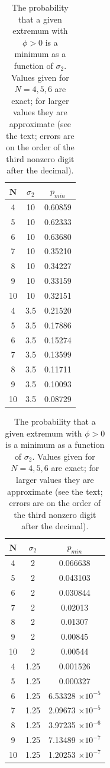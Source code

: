 \documentclass[12pt]{article}
\begin{document}
\begin{table}[h!] \label{Data}
  \begin{center}
    \caption{The probability that a given extremum with $\phi > 0$ is a minimum as a function of $\sigma_2$. Values given for $N=4,5,6$ are exact; for larger values they are approximate (see the text; errors are on the order of the third nonzero digit after the decimal).}
    \label{tab:table1}
    \begin{tabular}{c|c|c} %
      $\textbf{N}$ & $\sigma_2$ & $p_{min}$\\
      \hline
      4 & 10 & 0.60859\\
      5 & 10 & 0.62333\\
      6 & 10 & 0.63680\\
      7 & 10 & 0.35210\\
      8 & 10 & 0.34227\\
      9 & 10 & 0.33159\\
      10 & 10 & 0.32151\\
      \hline
      4 & 3.5 & 0.21520\\
      5 & 3.5 & 0.17886\\
      6 & 3.5 & 0.15274\\
      7 & 3.5 & 0.13599\\
      8 & 3.5 & 0.11711\\
      9 & 3.5 & 0.10093\\
      10 & 3.5 & 0.08729\\
      \end{tabular}
      \quad
      \begin{tabular}{c|c|c} 
      $\textbf{N}$ & $\sigma_2$ & $p_{min}$\\
      \hline
      4 & 2 & 0.066638\\
      5 & 2 & 0.043103\\
      6 & 2 & 0.030844\\
      7 & 2 & 0.02013\\
      8 & 2 & 0.01307\\
      9 & 2 & 0.00845\\
      10 & 2 & 0.00544\\
      \hline
      4 & 1.25 & 0.001526\\
      5 & 1.25 & 0.000327\\
      6 & 1.25 & 6.53328 $\times 10^{-5}$\\
      7 & 1.25 & 2.09673 $\times 10^{-5}$ \\
      8 & 1.25 & 3.97235  $\times 10^{-6}$ \\
      9 & 1.25 & 7.13489  $\times 10^{-7}$ \\
      10 & 1.25 & 1.20253  $\times 10^{-7}$ \\
     \end{tabular}
  \end{center}
\end{table}
\end{document}
